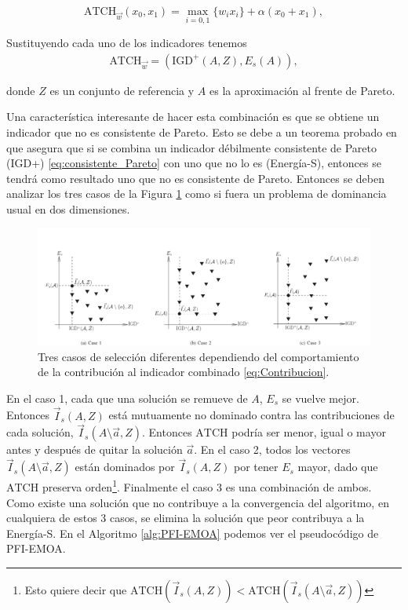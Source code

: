 \begin{equation} \label{eq:ATCH}
    \text{ATCH}_{\vec{w}}(x_0,x_1)=\max_{i=0,1} \{w_ix_i\}+\alpha (x_0+x_1),  
\end{equation}


Sustituyendo cada uno de los indicadores tenemos
\begin{align*}
\text{ATCH}_{\vec{w}}=({\text{IGD}}^+(A,Z),E_s(A)), \nonumber
\end{align*}

donde $Z$ es un conjunto de referencia y $A$ es la aproximación al frente de Pareto.

Una característica interesante de hacer esta combinación es que se obtiene un indicador que no es consistente de Pareto. Esto se debe a un teorema probado en \cite{falcon-cardonaConstructionParetoCompliantCombined2022} que asegura que si se combina un indicador débilmente consistente de Pareto (IGD+) \eqref{eq:consistente_Pareto} con uno que no lo es (Energía-S), entonces se tendrá como resultado uno que no es consistente de Pareto. Entonces se deben analizar los tres casos de la Figura \ref{fig:casos} como si fuera un problema de dominancia usual en dos dimensiones.

\begin{figure}[H]
    \centering
    \includegraphics[width=\textwidth]{Figuras/casos.png}
    \caption[Tres casos para PFI.emoa]{Tres casos de selección diferentes dependiendo del comportamiento de la contribución al indicador combinado \eqref{eq:Contribucion}.}
    \label{fig:casos}
\end{figure}

En el caso 1, cada que una solución se remueve de $A$, $E_s$ se vuelve mejor. Entonces $\vec{I}_s(A,Z)$ está mutuamente no dominado contra las contribuciones de cada solución, $\vec{I}_s(A \setminus {\vec{a}},Z)$. Entonces $\text{ATCH}$ podría ser menor, igual o mayor antes y después de quitar la solución $\vec{a}$. En el caso 2, todos los vectores  $\vec{I}_s(A \setminus {\vec{a}},Z)$ están dominados por  $\vec{I}_s(A ,Z)$ por tener $E_s$ mayor, dado que $\text{ATCH}$ preserva orden\footnote{Esto quiere decir que $\text{ATCH}(\vec{I}_s(A,Z))< \text{ATCH}(\vec{I}_s(A \setminus {\vec{a}},Z))$}. Finalmente el caso 3 es una combinación de ambos. Como existe una solución que no contribuye a la convergencia del algoritmo, en cualquiera de estos 3 casos, se elimina la solución que peor contribuya a la Energía-S. En el Algoritmo \ref{alg:PFI-EMOA} podemos ver el pseudocódigo de PFI-EMOA.


